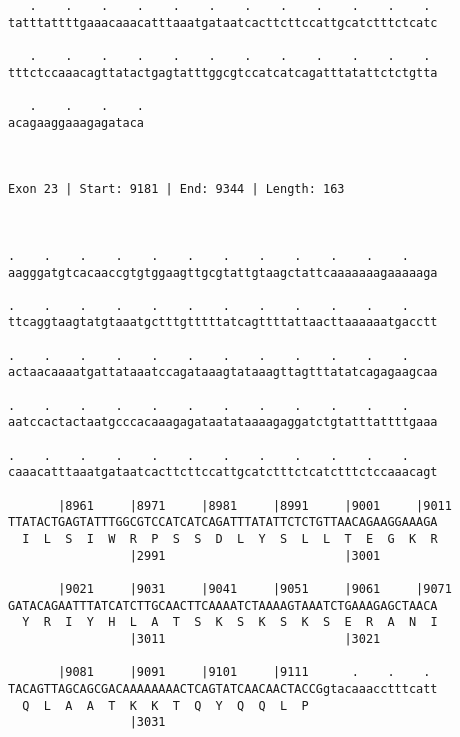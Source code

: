 \documentclass{article}
\begin{document}
\begin{Verbatim}
   .    .    .    .    .    .    .    .    .    .    .    . 
tatttattttgaaacaaacatttaaatgataatcacttcttccattgcatctttctcatc
                                                            
   .    .    .    .    .    .    .    .    .    .    .    . 
tttctccaaacagttatactgagtatttggcgtccatcatcagatttatattctctgtta
                                                            
   .    .    .    .
acagaaggaaagagataca
                   
                   
 
Exon 23 | Start: 9181 | End: 9344 | Length: 163



.    .    .    .    .    .    .    .    .    .    .    .    
aagggatgtcacaaccgtgtggaagttgcgtattgtaagctattcaaaaaaagaaaaaga
                                                            
.    .    .    .    .    .    .    .    .    .    .    .    
ttcaggtaagtatgtaaatgctttgtttttatcagttttattaacttaaaaaatgacctt
                                                            
.    .    .    .    .    .    .    .    .    .    .    .    
actaacaaaatgattataaatccagataaagtataaagttagtttatatcagagaagcaa
                                                            
.    .    .    .    .    .    .    .    .    .    .    .    
aatccactactaatgcccacaaagagataatataaaagaggatctgtatttattttgaaa
                                                            
.    .    .    .    .    .    .    .    .    .    .    .    
caaacatttaaatgataatcacttcttccattgcatctttctcatctttctccaaacagt
                                                            
       |8961     |8971     |8981     |8991     |9001     |9011
TTATACTGAGTATTTGGCGTCCATCATCAGATTTATATTCTCTGTTAACAGAAGGAAAGA
  I  L  S  I  W  R  P  S  S  D  L  Y  S  L  L  T  E  G  K  R
                 |2991                         |3001        
  
       |9021     |9031     |9041     |9051     |9061     |9071
GATACAGAATTTATCATCTTGCAACTTCAAAATCTAAAAGTAAATCTGAAAGAGCTAACA
  Y  R  I  Y  H  L  A  T  S  K  S  K  S  K  S  E  R  A  N  I
                 |3011                         |3021        
  
       |9081     |9091     |9101     |9111      .    .    . 
TACAGTTAGCAGCGACAAAAAAAACTCAGTATCAACAACTACCGgtacaaacctttcatt
  Q  L  A  A  T  K  K  T  Q  Y  Q  Q  L  P                  
                 |3031                                      
  

\end{Verbatim}
\end{document}
